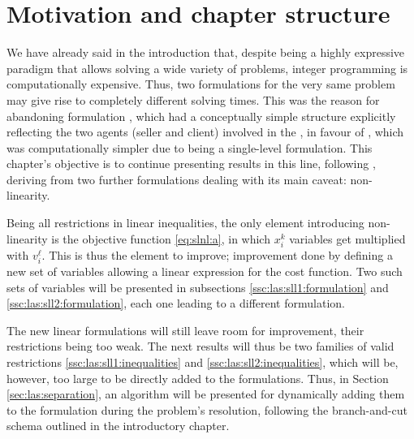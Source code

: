 \section{Motivation and chapter structure} %
\label{sec:las:motivation}

We have already said in the introduction that, despite being a highly expressive
paradigm that allows solving a wide variety of problems, integer programming is
computationally expensive. Thus, two formulations for the very same problem may
give rise to completely different solving times. This was the reason for
abandoning formulation \bnlv, which had a conceptually simple structure
explicitly reflecting the two agents (seller and client) involved in the \rpp,
in favour of \slnl, which was computationally simpler due to being a
single-level formulation. This chapter's objective is to continue presenting
results in this line, following \cite{ca:rpp}, deriving from \slnl two further
formulations dealing with its main caveat: non-linearity.

Being all restrictions in \slnl linear inequalities, the only element
introducing non-linearity is the objective function \eqref{eq:slnl:a}, in which
$x_i^k$ variables get multiplied with $v_i^\ell$. This is thus the element to
improve; improvement done by defining a new set of variables allowing a linear
expression for the cost function. Two such sets of variables will be presented
in subsections \ref{ssc:las:sll1:formulation} and
\ref{ssc:las:sll2:formulation}, each one leading to a different formulation.

The new linear formulations will still leave room for improvement, their
restrictions being too weak. The next results will thus be two families of valid
restrictions \eqref{ssc:las:sll1:inequalities} and
\eqref{ssc:las:sll2:inequalities}, which will be, however, too large to be
directly added to the formulations. Thus, in Section \ref{sec:las:separation},
an algorithm will be presented for dynamically adding them to the formulation
during the problem's resolution, following the branch-and-cut schema outlined in
the introductory chapter.
